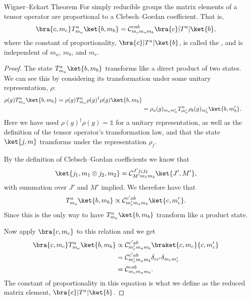 \documentclass[fleqn]{NotesClass}
\newcommand*{\hermit}{\dagger}
\newcommand*{\ident}{\mathbb{1}}
\newcommand*{\directproduct}{\otimes}
\newcommand*{\clebschgordan}[6]{\mathcal{C}_{#1#2#3}^{#4#5#6}}
\begin{document}
    \begin{thm}{Wigner--Eckart Theorem}{}
        For simply reducible groups the matrix elements of a tensor operator are proportional to a Clebsch--Gordan coefficient.
        That is,
        \begin{equation}
            \bra{c, m_c} T_{m_a}^a\ket{b, m_b} = \clebschgordan{m_c}{m_a}{m_b}{c}{a}{b} \bra{c} |T^a| \ket{b},
        \end{equation}
        where the constant of proportionality, \(\bra{c} |T^a| \ket{b}\), is called the , and is independent of \(m_a\), \(m_b\), and \(m_c\).
        
        \begin{proof}
            The state \(T^a_{m_a}\ket{b, m_b}\) transforms like a direct product of two states.
            We can see this by considering its transformation under some unitary representation, \(\rho\):
            \begin{align}
                \rho(g) T^a_{m_a} \ket{b, m_b} = \rho(g) T^{a}_{m_a} \rho(g)^\hermit \rho(g) \ket{b, m_b}\\
                &= \rho_a(g)_{m_am_a'}T^a_{m_a'} \rho_b(g)_{m_b'}\ket{b, m_b'}.
            \end{align}
            Here we have used \(\rho(g)^\hermit\rho(g) = \ident\) for a unitary representation, as well as the definition of the tensor operator's transformation law, and that the state \(\ket{j, m}\) transforms under the representation \(\rho_j\).
            
            By the definition of Clebsch--Gordan coefficients we know that
            \begin{equation}
                \ket{j_1, m_1 \directproduct j_2, m_2} = \clebschgordan{M'}{m_1}{m_2}{J'}{j_1}{j_2}\ket{J', M'},
            \end{equation}
            with summation over \(J'\) and \(M'\) implied.
            We therefore have that
            \begin{equation}
                T_{m_a}^{a}\ket{b, m_b} \propto \clebschgordan{m_c'}{m_a}{m_b}{c'}{a}{b}\ket{c, m_c'}.
            \end{equation}
            Since this is the only way to have \(T_{m_a}^a\ket{b, m_b}\) transform like a product state.
            
            Now apply \(\bra{c, m_c}\) to this relation and we get
            \begin{align}
                \bra{c, m_c}T_{m_a}^{a}\ket{b, m_b} &\propto \clebschgordan{m_c'}{m_a}{m_b}{c'}{a}{b} \braket{c, m_c}{c, m_c'}\\
                &= \clebschgordan{m_c'}{m_a}{m_b}{c'}{a}{b} \delta_{cc'}\delta_{m_cm_c'}\\
                &= \clebschgordan{m_c}{m_a}{m_b}{c}{a}{b}.
            \end{align}
            The constant of proportionality in this equation is what we define as the reduced matrix element, \(\bra{c}|T^a|\ket{b}\).
        \end{proof}
    \end{thm}
    
\end{document}
